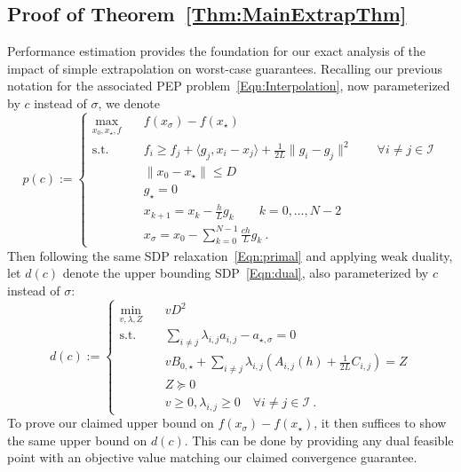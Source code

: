 \documentclass[11pt]{article}
\numberwithin{equation}{section}
\theoremstyle{definition}
\theoremstyle{definition}
\theoremstyle{definition}
\newcommand{\1}{\mathbf{1}}
\newcommand{\xStar}{x_\star}
\newcommand{\xSpecial}{x_\sigma}
\newcommand{\idxSpecial}{\sigma}
\begin{document}
\subsection{Proof of Theorem~\ref{Thm:MainExtrapThm}} \label{SubSect:ProofOfExtrap}
Performance estimation provides the foundation for our exact analysis of the impact of simple extrapolation on worst-case guarantees. Recalling our previous notation for the associated PEP problem~\eqref{Eqn:Interpolation}, now parameterized by $c$ instead of $\sigma$, we denote
\begin{equation*}
    p(c) := \begin{cases} \max_{x_0,\xStar,f} \quad & f(\xSpecial) - f(\xStar) \\
                    \text{s.t.} \quad & f_i\geq f_j+\langle g_j,x_i-x_j\rangle +\frac{1}{2L}\| g_i - g_j\|^2 \quad \quad \forall i\neq j \in \mathcal{I}\\
                    & \|x_0-\xStar\| \leq D \\
                    & g_\star = 0 \\
                    & x_{k+1} = x_k - \frac{h}{L} g_k \quad \quad k=0,\dots,N-2\\
                    & \xSpecial = x_0 - \sum_{k=0}^{N-1} \frac{ch}{L} g_k \ . 
                \end{cases}
\end{equation*}
Then following the same SDP relaxation~\eqref{Eqn:primal} and applying weak duality, let $d(c)$ denote the upper bounding SDP~\eqref{Eqn:dual}, also parameterized by $c$ instead of $\sigma$:
\begin{equation}
    d(c) := \begin{cases}
        \min_{v,\lambda,Z} \quad  & v D^2 \\
        \text{s.t. } & \sum_{i\neq j} \lambda_{i,j} a_{i,j} - a_{\star,\idxSpecial} = 0 \\
        & v B_{0,\star} + \sum_{i\neq j} \lambda_{i,j} (A_{i,j}(h) + \frac{1}{2L}C_{i,j}) = Z  \\
        & Z \succeq 0 \\
        & v \geq 0, \lambda_{i,j} \geq 0  \quad \forall i\neq j \in \mathcal{I} \ .
    \end{cases}
\end{equation}
To prove our claimed upper bound on $f(\xSpecial)-f(\xStar)$, it then suffices to show the same upper bound on $d(c)$. This can be done by providing any dual feasible point with an objective value matching our claimed convergence guarantee.
\end{document}
